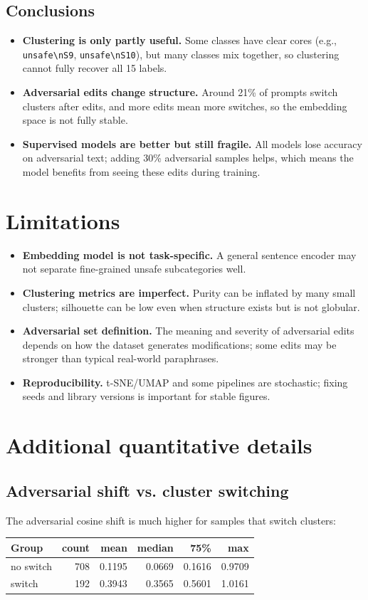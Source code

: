 \documentclass[11pt,a4paper]{article}
\begin{document}
\subsection{Conclusions}
\begin{itemize}[leftmargin=*]
\item \textbf{Clustering is only partly useful.} Some classes have clear cores (e.g., \texttt{unsafe\textbackslash nS9}, \texttt{unsafe\textbackslash nS10}), but many classes mix together, so clustering cannot fully recover all 15 labels.
\item \textbf{Adversarial edits change structure.} Around 21\% of prompts switch clusters after edits, and more edits mean more switches, so the embedding space is not fully stable.
\item \textbf{Supervised models are better but still fragile.} All models lose accuracy on adversarial text; adding 30\% adversarial samples helps, which means the model benefits from seeing these edits during training.
\end{itemize}

\section{Limitations}
\begin{itemize}[leftmargin=*]
\item \textbf{Embedding model is not task-specific.} A general sentence encoder may not separate fine-grained unsafe subcategories well.
\item \textbf{Clustering metrics are imperfect.} Purity can be inflated by many small clusters; silhouette can be low even when structure exists but is not globular.
\item \textbf{Adversarial set definition.} The meaning and severity of adversarial edits depends on how the dataset generates modifications; some edits may be stronger than typical real-world paraphrases.
\item \textbf{Reproducibility.} t-SNE/UMAP and some pipelines are stochastic; fixing seeds and library versions is important for stable figures.
\end{itemize}

\appendix

\section{Additional quantitative details}
\subsection{Adversarial shift vs. cluster switching}
The adversarial cosine shift is much higher for samples that switch clusters:
\begin{center}
\begin{tabular}{lrrrrr}
\toprule
Group & count & mean & median & 75\% & max \\
\midrule
no switch & 708 & 0.1195 & 0.0669 & 0.1616 & 0.9709 \\
switch    & 192 & 0.3943 & 0.3565 & 0.5601 & 1.0161 \\
\bottomrule
\end{tabular}
\end{center}
\end{document}
